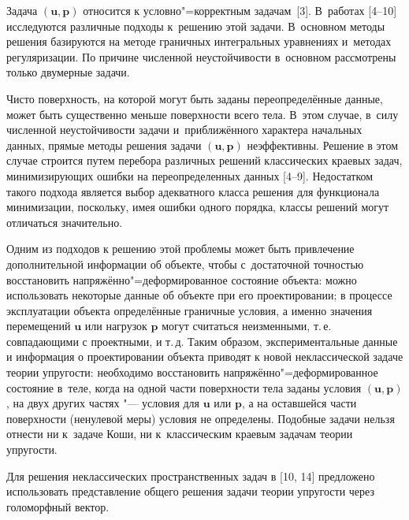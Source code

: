 Задача $(\boldsymbol{u}, \boldsymbol{p})$ относится к условно"=корректным задачам~[3]. 
В~работах \mbox{[4--10]} исследуются различные подходы к~решению этой задачи. 
В~основном методы решения базируются на методе граничных интегральных уравнениях и~методах регуляризации. 
По причине численной неустойчивости в~основном рассмотрены только двумерные задачи.
      
Чисто поверхность,  на которой могут быть заданы переопределённые данные,  может быть существенно меньше поверхности всего тела. 
В~этом случае, в~силу численной неустойчивости задачи и~приближённого характера начальных данных, прямые методы решения задачи $(\boldsymbol{u}, \boldsymbol{p})$ неэффективны.
Решение в этом случае строится путем перебора различных решений классических краевых задач,  минимизирующих    ошибки  на переопределенных данных \mbox{[4--9]}. 
Недостатком такого подхода является выбор адекватного класса решения для функционала  минимизации, поскольку, имея ошибки одного порядка, классы решений могут отличаться значительно.
     
Одним из подходов к решению этой проблемы может быть привлечение дополнительной информации об объекте,  чтобы  с~достаточной точностью восстановить напряжённо"=деформированное состояние объекта: можно использовать  некоторые данные об объекте  при его проектировании;    в процессе эксплуатации объекта   определённые граничные условия, а именно значения перемещений $\boldsymbol{u}$ или нагрузок
   $\boldsymbol{p}$ могут считаться неизменными, т.\,е. совпадающими с проектными, и т.\,д. 
Таким образом, экспериментальные данные и информация о проектировании объекта приводят к новой неклассической задаче теории упругости: необходимо восстановить напряжённо"=деформированное состояние в~теле, когда на одной  части поверхности тела заданы условия $(\boldsymbol{u}, \boldsymbol{p})$,
на двух других частях "--- условия для $\boldsymbol{u}$ или $\boldsymbol{p}$,  а на оставшейся части поверхности (ненулевой меры) условия не определены. Подобные задачи  нельзя отнести  ни к~задаче Коши, ни к~классическим краевым задачам теории упругости. 
       
     
      
Для решения неклассических пространственных задач в [10, 14] предложено  использовать представление общего решения задачи теории упругости через голоморфный вектор.

